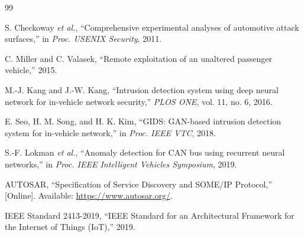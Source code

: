\documentclass[conference]{IEEEtran}
\begin{document}
\begin{thebibliography}{99}

S. Checkoway \emph{et al.}, ``Comprehensive experimental analyses of automotive attack surfaces,'' in \emph{Proc. USENIX Security}, 2011.

C. Miller and C. Valasek, ``Remote exploitation of an unaltered passenger vehicle,'' 2015.

M.-J. Kang and J.-W. Kang, ``Intrusion detection system using deep neural network for in-vehicle network security,'' \emph{PLOS ONE}, vol. 11, no. 6, 2016.

E. Seo, H. M. Song, and H. K. Kim, ``GIDS: GAN-based intrusion detection system for in-vehicle network,'' in \emph{Proc. IEEE VTC}, 2018.

S.-F. Lokman \emph{et al.}, ``Anomaly detection for CAN bus using recurrent neural networks,'' in \emph{Proc. IEEE Intelligent Vehicles Symposium}, 2019.

AUTOSAR, ``Specification of Service Discovery and SOME/IP Protocol,'' [Online]. Available: \url{https://www.autosar.org/}.

IEEE Standard 2413-2019, ``IEEE Standard for an Architectural Framework for the Internet of Things (IoT),'' 2019.

\end{thebibliography}
\end{document}
